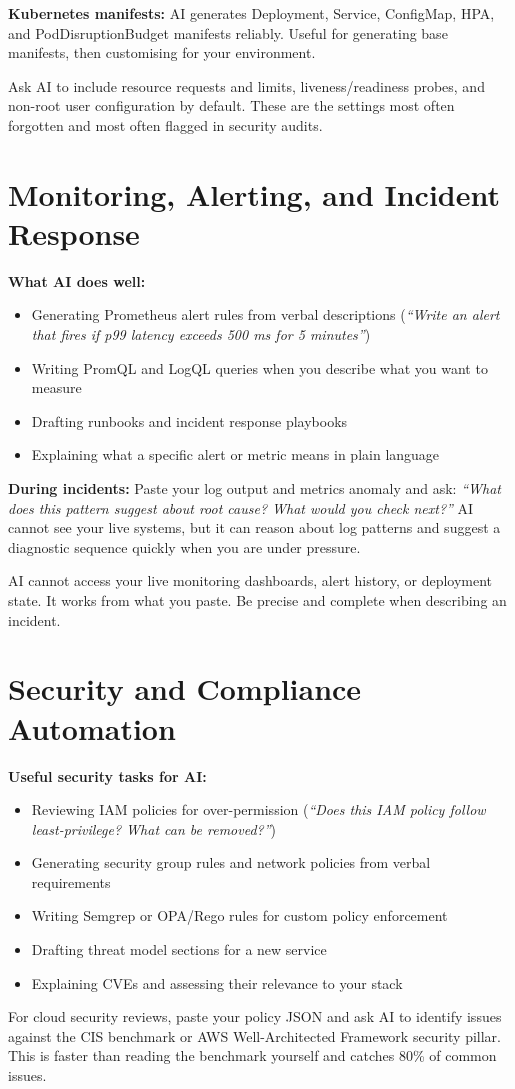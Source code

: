 \textbf{Kubernetes manifests:}
AI generates Deployment, Service, ConfigMap, HPA, and PodDisruptionBudget manifests
reliably.
Useful for generating base manifests, then customising for your environment.

\begin{tipbox}
Ask AI to include resource requests and limits, liveness/readiness probes, and
non-root user configuration by default.
These are the settings most often forgotten and most often flagged in security audits.
\end{tipbox}

\section{Monitoring, Alerting, and Incident Response}
\label{sec:monitoring}

\textbf{What AI does well:}
\begin{itemize}
  \item Generating Prometheus alert rules from verbal descriptions
    (\textit{``Write an alert that fires if p99 latency exceeds 500 ms for 5 minutes''})
  \item Writing PromQL and LogQL queries when you describe what you want to measure
  \item Drafting runbooks and incident response playbooks
  \item Explaining what a specific alert or metric means in plain language
\end{itemize}

\textbf{During incidents:}
Paste your log output and metrics anomaly and ask:
\textit{``What does this pattern suggest about root cause? What would you check next?''}
AI cannot see your live systems, but it can reason about log patterns and suggest a
diagnostic sequence quickly when you are under pressure.

\begin{warnbox}
AI cannot access your live monitoring dashboards, alert history, or deployment state.
It works from what you paste. Be precise and complete when describing an incident.
\end{warnbox}

\section{Security and Compliance Automation}
\label{sec:sec-compliance}

\textbf{Useful security tasks for AI:}
\begin{itemize}
  \item Reviewing IAM policies for over-permission (\textit{``Does this IAM policy follow least-privilege? What can be removed?''})
  \item Generating security group rules and network policies from verbal requirements
  \item Writing Semgrep or OPA/Rego rules for custom policy enforcement
  \item Drafting threat model sections for a new service
  \item Explaining CVEs and assessing their relevance to your stack
\end{itemize}

\begin{tipbox}
For cloud security reviews, paste your policy JSON and ask AI to identify issues against
the CIS benchmark or AWS Well-Architected Framework security pillar.
This is faster than reading the benchmark yourself and catches 80\% of common issues.
\end{tipbox}
